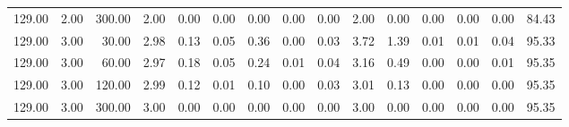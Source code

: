 \begin{table}[ht]
\begin{tabular}{rrrrrrrrrrrrrrr}
  129.00 & 2.00 & 300.00 & 2.00 & 0.00 & 0.00 & 0.00 & 0.00 & 0.00 & 2.00 & 0.00 & 0.00 & 0.00 & 0.00 & 84.43 \\ 
  129.00 & 3.00 & 30.00 & 2.98 & 0.13 & 0.05 & 0.36 & 0.00 & 0.03 & 3.72 & 1.39 & 0.01 & 0.01 & 0.04 & 95.33 \\ 
  129.00 & 3.00 & 60.00 & 2.97 & 0.18 & 0.05 & 0.24 & 0.01 & 0.04 & 3.16 & 0.49 & 0.00 & 0.00 & 0.01 & 95.35 \\ 
  129.00 & 3.00 & 120.00 & 2.99 & 0.12 & 0.01 & 0.10 & 0.00 & 0.03 & 3.01 & 0.13 & 0.00 & 0.00 & 0.00 & 95.35 \\ 
  129.00 & 3.00 & 300.00 & 3.00 & 0.00 & 0.00 & 0.00 & 0.00 & 0.00 & 3.00 & 0.00 & 0.00 & 0.00 & 0.00 & 95.35 \\ 
   \hline
\end{tabular}
\end{table}
